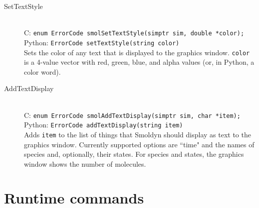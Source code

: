\documentclass {book}
\begin{document}
\begin{description}
\item[SetTextStyle]
\hfill \\
C: \texttt{enum ErrorCode smolSetTextStyle(simptr sim, double *color);}\\
Python: \texttt{ErrorCode setTextStyle(string color)}\\
Sets the color of any text that is displayed to the graphics window. \texttt{color} is a 4-value vector with red, green, blue, and alpha values (or, in Python, a color word).

\item[AddTextDisplay]
\hfill \\
C: \texttt{enum ErrorCode smolAddTextDisplay(simptr sim, char *item);}\\
Python: \texttt{ErrorCode addTextDisplay(string item)}\\
Adds \texttt{item} to the list of things that Smoldyn should display as text to the graphics window. Currently supported options are ``time" and the names of species and, optionally, their states. For species and states, the graphics window shows the number of molecules.

\end{description}

\section{Runtime commands}
\end{document}
